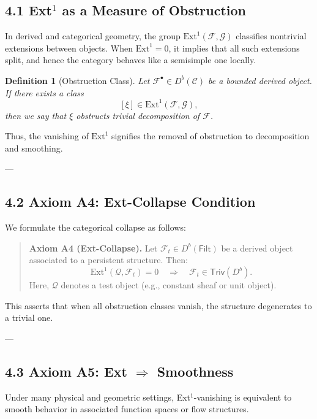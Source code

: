 \documentclass[11pt]{article}
\newtheorem{definition}[theorem]{Definition}
\begin{document}
\subsection*{4.1 Ext$^1$ as a Measure of Obstruction}

In derived and categorical geometry, the group \( \mathrm{Ext}^1(\mathcal{F}, \mathcal{G}) \) classifies  
nontrivial extensions between objects. When \( \mathrm{Ext}^1 = 0 \), it implies that all such extensions  
split, and hence the category behaves like a semisimple one locally.

\begin{definition}[Obstruction Class]
Let \( \mathcal{F}^\bullet \in D^b(\mathcal{C}) \) be a bounded derived object.  
If there exists a class
\[
[\xi] \in \mathrm{Ext}^1(\mathcal{F}, \mathcal{G}),
\]
then we say that \( \xi \) obstructs trivial decomposition of \( \mathcal{F} \).
\end{definition}

Thus, the vanishing of \( \mathrm{Ext}^1 \) signifies the removal of obstruction to decomposition and smoothing.

---

\subsection*{4.2 Axiom A4: Ext-Collapse Condition}

We formulate the categorical collapse as follows:

\begin{quote}
\textbf{Axiom A4 (Ext-Collapse).}  
Let \( \mathcal{F}_t \in D^b(\mathsf{Filt}) \) be a derived object associated to a persistent structure.  
Then:
\[
\mathrm{Ext}^1(\mathcal{Q}, \mathcal{F}_t) = 0 
\quad \Longrightarrow \quad 
\mathcal{F}_t \in \mathsf{Triv}(D^b).
\]
Here, \( \mathcal{Q} \) denotes a test object (e.g., constant sheaf or unit object).
\end{quote}

This asserts that when all obstruction classes vanish, the structure degenerates to a trivial one.

---

\subsection*{4.3 Axiom A5: Ext $\Rightarrow$ Smoothness}

Under many physical and geometric settings, Ext$^1$-vanishing is equivalent to smooth behavior  
in associated function spaces or flow structures.
\end{document}
